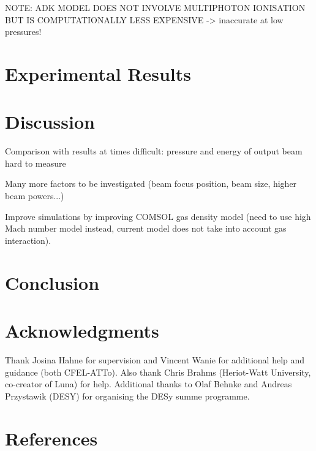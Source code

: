 \documentclass[a4paper]{jpconf}
\begin{document}
NOTE: ADK MODEL DOES NOT INVOLVE MULTIPHOTON IONISATION BUT IS COMPUTATIONALLY LESS EXPENSIVE
-> inaccurate at low pressures! 
\section{Experimental Results}

\section{Discussion}
Comparison with results at times difficult: pressure and energy of output beam hard to measure


Many more factors to be investigated (beam focus position, beam size, higher beam powers...)


Improve simulations by improving COMSOL gas density model (need to use high Mach number model instead, current model does not take into account gas interaction). 

\section{Conclusion}

\section*{Acknowledgments}
Thank Josina Hahne for supervision and Vincent Wanie for additional help and guidance (both CFEL-ATTo). Also thank Chris Brahms (Heriot-Watt University, co-creator of Luna) for help. Additional thanks to Olaf Behnke and Andreas Przystawik (DESY) for organising the DESy summe programme.  


\cite{brahms2023}

\section*{References}


\end{document}
